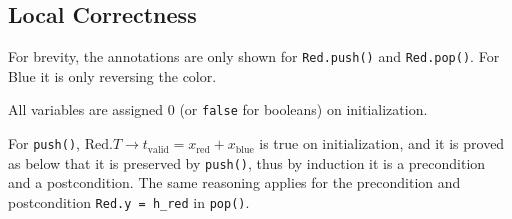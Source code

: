 \documentclass[a4paper, 11pt]{article}
\begin{document}
\subsection*{Local Correctness}

For brevity, the annotations are only shown for \texttt{Red.push()} and \texttt{Red.pop()}. For Blue it is only reversing the color.

All variables are assigned 0 (or \texttt{false} for booleans) on initialization.

For \texttt{push()}, $\text{Red}.T \rightarrow t_\text{valid} = x_\text{red} + x_\text{blue}$ is true on initialization, and it is proved as below that it is preserved by \texttt{push()}, thus by induction it is a precondition and a postcondition. The same reasoning applies for the precondition and postcondition \texttt{Red.y = h\_red} in \texttt{pop()}.
\end{document}
